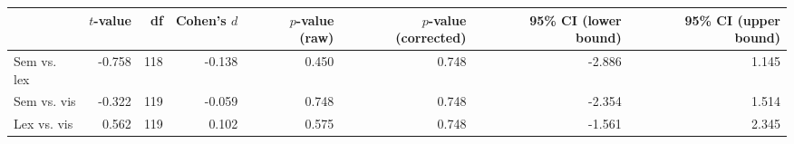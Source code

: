 \begin{tabular}{lrrrrrrr}
\toprule
 & $t$-value & df & Cohen's $d$ & $p$-value (raw) & $p$-value (corrected) & 95\% CI (lower bound) & 95\% CI (upper bound) \\
\midrule
 Sem vs. lex & -0.758 & 118 & -0.138 & 0.450 & 0.748 & -2.886 & 1.145 \\
 Sem vs. vis & -0.322 & 119 & -0.059 & 0.748 & 0.748 & -2.354 & 1.514 \\
 Lex vs. vis & 0.562 & 119 & 0.102 & 0.575 & 0.748 & -1.561 & 2.345 \\
\bottomrule
\end{tabular}